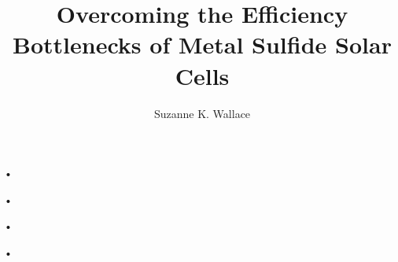 \documentclass[a4paper,12pt,twoside]{report}
\begin{document}
\title{\LARGE {\bf Overcoming the Efficiency Bottlenecks of Metal Sulfide Solar Cells}\\
 \vspace*{6mm}
}

\author{Suzanne K. Wallace}
\submitdate{\today}

\normallinespacing
\begin{footnotesize}
{\scriptsize •\begin{tiny}
•
\end{tiny}}
\end{footnotesize}\maketitle
\begin{scriptsize}
{\footnotesize •\begin{small}
•
\end{small}}
\end{scriptsize}
\preface


%
%

\body



%

%
%



\appendix




\end{document}
